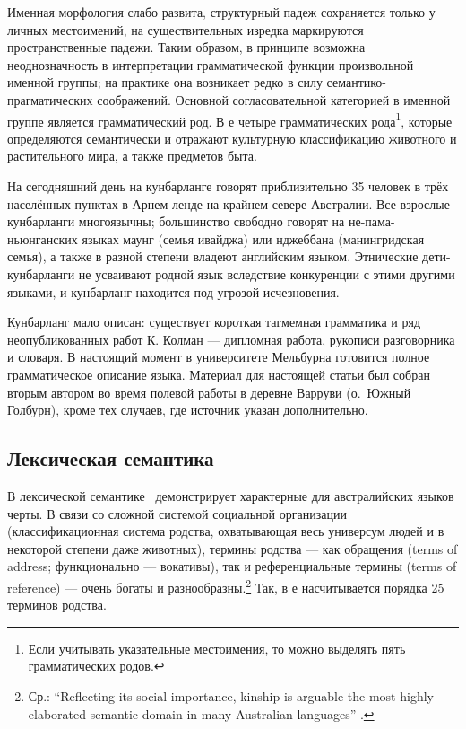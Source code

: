 Именная морфология слабо развита, структурный падеж сохраняется только у личных местоимений, на существительных изредка маркируются пространственные падежи. Таким образом, в принципе возможна неоднозначность в интерпретации грамматической функции произвольной именной группы; на практике она возникает редко в силу семантико-прагматических соображений. Основной согласовательной категорией в именной группе является грамматический род. В  е четыре грамматических рода\footnote{Если учитывать указательные местоимения, то можно выделять пять грамматических родов.}, которые определяются семантически и отражают культурную классификацию животного и растительного мира, а также предметов быта.

На сегодняшний день на кунбарланге говорят приблизительно 35 человек в трёх населённых пунктах в Арнем-ленде на крайнем севере Австралии. Все взрослые кунбарланги многоязычны; большинство свободно говорят на не-пама-ньюнганских языках маунг (семья ивайджа) или нджеббана (манингридская семья), а также в разной степени владеют английским языком. Этнические дети-кунбарланги не усваивают родной язык вследствие конкуренции с этими другими языками, и кунбарланг находится под угрозой исчезновения.

Кунбарланг мало описан: существует короткая тагмемная грамматика\autocite{harris69} и ряд неопубликованных работ К. Колман --- дипломная работа\autocite{coleman82}, рукописи разговорника\autocite{wordgra} и словаря\autocite{coleman10}. В настоящий момент в университете Мельбурна готовится полное грамматическое описание языка\autocite{ikwlg}.  Материал для настоящей статьи был собран вторым автором во время полевой работы в деревне Варруви (о.\ Южный Голбурн), кроме тех случаев, где источник указан дополнительно.

\subsection{Лексическая семантика}
\label{sec:lexsemover}
В лексической семантике \ демонстрирует характерные для австралийских языков черты. В связи со сложной системой социальной организации (классификационная система родства, охватывающая весь универсум людей и в некоторой степени даже животных), термины родства --- как обращения (terms of address; функционально --- вокативы), так и референциальные термины (terms of reference) --- очень богаты и разнообразны.\footnote{Ср.: ``Reflecting its social importance, kinship is arguable the most highly elaborated semantic domain in many Australian languages'' \autocite[304]{gabysinger14}.} Так, в  е насчитывается порядка 25 терминов родства.


